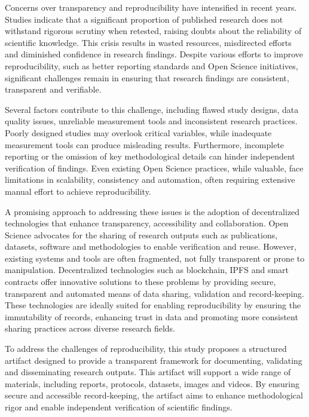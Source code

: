 Concerns over transparency and reproducibility have intensified in recent years. Studies indicate that a significant proportion of published research does not withstand rigorous scrutiny when retested, raising doubts about the reliability of scientific knowledge. This crisis results in wasted resources, misdirected efforts and diminished confidence in research findings. Despite various efforts to improve reproducibility, such as better reporting standards and Open Science initiatives, significant challenges remain in ensuring that research findings are consistent, transparent and verifiable.

Several factors contribute to this challenge, including flawed study designs, data quality issues, unreliable measurement tools and inconsistent research practices. Poorly designed studies may overlook critical variables, while inadequate measurement tools can produce misleading results. Furthermore, incomplete reporting or the omission of key methodological details can hinder independent verification of findings. Even existing Open Science practices, while valuable, face limitations in scalability, consistency and automation, often requiring extensive manual effort to achieve reproducibility.

A promising approach to addressing these issues is the adoption of decentralized technologies that enhance transparency, accessibility and collaboration. Open Science advocates for the sharing of research outputs such as publications, datasets, software and methodologies to enable verification and reuse. However, existing systems and tools are often fragmented, not fully transparent  or prone to manipulation. Decentralized technologies such as blockchain, IPFS and smart contracts offer innovative solutions to these problems by providing secure, transparent and automated means of data sharing, validation and record-keeping. These technologies are ideally suited for enabling reproducibility by ensuring the immutability of records, enhancing trust in data and promoting more consistent sharing practices across diverse research fields.

To address the challenges of reproducibility, this study proposes a structured artifact designed to provide a transparent framework for documenting, validating and disseminating research outputs. This artifact will support a wide range of materials, including reports, protocols, datasets, images and videos. By ensuring secure and accessible record-keeping, the artifact aims to enhance methodological rigor and enable independent verification of scientific findings.





